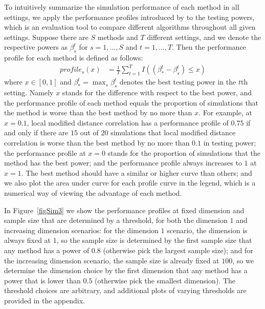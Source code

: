 \documentclass[12pt]{article}
\begin{document}
To intuitively summarize the simulation performance of each method in all settings, we apply the performance profiles introduced by \cite{DolanMore2002} to the testing powers, which is an evaluation tool to compare different algorithms throughout all given settings. Suppose there are $S$ methods and $T$ different settings, and we denote the respective powers as $\beta_{s}^{t}$ for $s=1,\ldots,S$ and $t=1,\ldots,T$. Then the performance profile for each method is defined as follows:
\begin{align*}
profile_{s}(x) &= \frac{1}{T} \sum_{t=1}^{T} I((\beta_{*}^{t}-\beta_{s}^{t}) \leq x)
\end{align*}
where $x \in [0,1]$ and $\beta_{*}^{t} =\max_{s} \beta_{s}^{t}$ denotes the best testing power in the $t$th setting. Namely $x$ stands for the difference with respect to the best power, and the performance profile of each method equals the proportion of simulations that the method is worse than the best method by no more than $x$. For example, at $x=0.1$, local modified distance correlation has a performance profile of $0.75$ if and only if there are $15$ out of $20$ simulations that local modified distance correlation is worse than the best method by no more than $0.1$ in testing power; the performance profile at $x=0$ stands for the proportion of simulations that the method has the best power; and the performance profile always increases to $1$ at $x=1$. The best method should have a similar or higher curve than others; and we also plot the area under curve for each profile curve in the legend, which is a numerical way of viewing the advantage of each method.

In Figure~\ref{figSim3} we show the performance profiles at fixed dimension and sample size that are determined by a threshold, for both the dimension $1$ and increasing dimension scenarios: for the dimension $1$ scenario, the dimension is always fixed at $1$, so the sample size is determined by the first sample size that any method has a power of $0.8$ (otherwise pick the largest sample size); and for the increasing dimension scenario, the sample size is already fixed at $100$, so we determine the dimension choice by the first dimension that any method has a power that is lower than $0.5$ (otherwise pick the smallest dimension). The threshold choices are arbitrary, and additional plots of varying thresholds are provided in the appendix.
\end{document}
